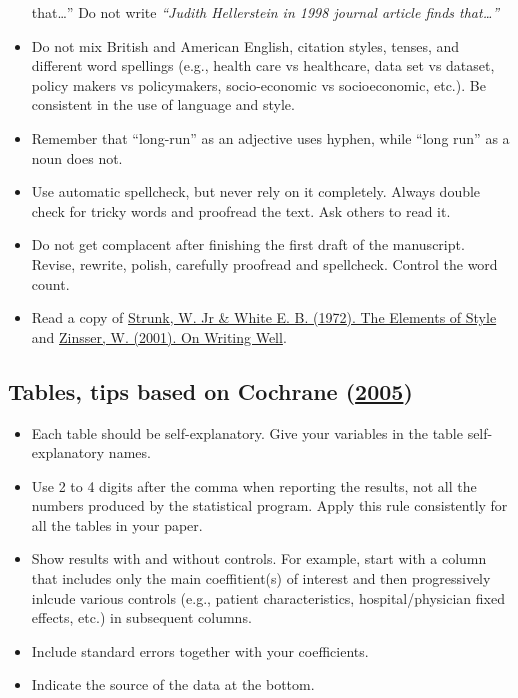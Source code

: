 \documentclass[
]{book}
\providecommand{\tightlist}{%
  \setlength{\itemsep}{0pt}\setlength{\parskip}{0pt}}
\begin{document}
\begin{itemize}
{  that\ldots{}''} Do not write \emph{``Judith Hellerstein in 1998
  journal article finds that\ldots{}''}
\item
  Do not mix British and American English, citation styles, tenses, and
  different word spellings (e.g., health care vs healthcare, data set vs
  dataset, policy makers vs policymakers, socio-economic vs
  socioeconomic, etc.). Be consistent in the use of language and style.
\item
  Remember that ``long-run'' as an adjective uses hyphen, while ``long
  run'' as a noun does not.
\item
  Use automatic spellcheck, but never rely on it completely. Always
  double check for tricky words and proofread the text. Ask others to
  read it.
\item
  Do not get complacent after finishing the first draft of the
  manuscript. Revise, rewrite, polish, carefully proofread and
  spellcheck. Control the word count.
\item
  Read a copy of
  \href{http://www.jlakes.org/ch/web/The-elements-of-style.pdf}{Strunk,
  W. Jr \& White E. B. (1972). The Elements of Style} and
  \href{https://www.google.com/url?sa=t\&rct=j\&q=\&esrc=s\&source=web\&cd=\&ved=2ahUKEwiCztfjrsr0AhXvR_EDHU3aAYsQFnoECA4QAQ\&url=https\%3A\%2F\%2Fteamwork.jacobs-university.de\%2Fdownload\%2Fattachments\%2F49185212\%2Fon-writing-well.pdf\%3Fversion\%3D1\%26modificationDate\%3D1527540932000\%26api\%3Dv2\&usg=AOvVaw3eFZJabrSvWpKo5WxCAS6t}{Zinsser,
  W. (2001). On Writing Well}.
\end{itemize}

\hypertarget{tables-tips-based-on-cochrane_writing_2005}{%
\subsection{\texorpdfstring{Tables, tips based on Cochrane
(\protect\hyperlink{ref-cochrane_writing_2005}{2005})}{Tables, tips based on Cochrane (2005)}}\label{tables-tips-based-on-cochrane_writing_2005}}

\begin{itemize}
\tightlist
\item
  Each table should be self-explanatory. Give your variables in the
  table self-explanatory names.
\item
  Use 2 to 4 digits after the comma when reporting the results, not all
  the numbers produced by the statistical program. Apply this rule
  consistently for all the tables in your paper.
\item
  Show results with and without controls. For example, start with a
  column that includes only the main coeffitient(s) of interest and then
  progressively inlcude various controls (e.g., patient characteristics,
  hospital/physician fixed effects, etc.) in subsequent columns.
\item
  Include standard errors together with your coefficients.
\item
  Indicate the source of the data at the bottom.
\end{itemize}
\end{document}
